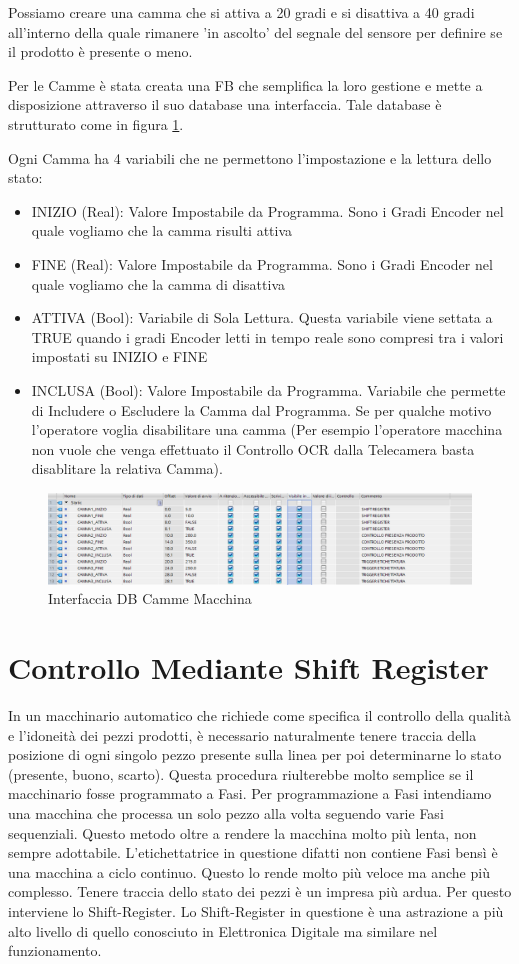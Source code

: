 \documentclass[12pt, a4paper, oneside]{book}
\begin{document}
Possiamo creare una camma che si attiva a 20 gradi e si disattiva a 40 gradi all'interno della quale rimanere 'in ascolto' del segnale del sensore per definire se il prodotto è presente o meno.

Per le Camme è stata creata una FB che semplifica la loro gestione e mette a disposizione attraverso il suo database una interfaccia. Tale database è strutturato come in figura \ref{CAMME4}.

Ogni Camma ha 4 variabili che ne permettono l'impostazione e la lettura dello stato:
\begin{itemize}
	\item INIZIO (Real): Valore Impostabile da Programma. Sono i Gradi Encoder nel quale vogliamo che la camma risulti attiva
	\item FINE (Real): Valore Impostabile da Programma. Sono i Gradi Encoder nel quale vogliamo che la camma di disattiva
	\item ATTIVA (Bool): Variabile di Sola Lettura. Questa variabile viene settata a TRUE quando i gradi Encoder letti in tempo reale sono compresi tra i valori impostati su INIZIO e FINE
	\item INCLUSA (Bool): Valore Impostabile da Programma. Variabile che permette di Includere o Escludere la Camma dal Programma. Se per qualche motivo l'operatore voglia disabilitare una camma (Per esempio l'operatore macchina non vuole che venga effettuato il Controllo OCR dalla Telecamera basta disablitare la relativa Camma).
\end{itemize}

\begin{figure}[H]
	\centering
	\includegraphics[width=12cm]{Immagini/CAM1}
	\caption{ Interfaccia DB Camme Macchina}
	\label{CAMME4}
\end{figure}


\section{Controllo Mediante Shift Register}
In un macchinario automatico che richiede come specifica il controllo della qualità e l'idoneità dei pezzi prodotti, è necessario naturalmente tenere traccia della posizione di ogni singolo pezzo presente sulla linea per poi determinarne lo stato (presente, buono, scarto). Questa procedura riulterebbe molto semplice se il macchinario fosse programmato a Fasi. Per programmazione a Fasi intendiamo una macchina che processa un solo pezzo alla volta seguendo varie Fasi sequenziali. Questo metodo oltre a rendere la macchina molto più lenta, non sempre adottabile. L'etichettatrice in questione difatti non contiene Fasi bensì è una macchina a ciclo continuo. Questo lo rende molto più veloce ma anche più complesso. Tenere traccia dello stato dei pezzi è un impresa più ardua. Per questo interviene lo Shift-Register.
Lo Shift-Register in questione è una astrazione a più alto livello di quello conosciuto in Elettronica Digitale ma similare nel funzionamento.
\end{document}
